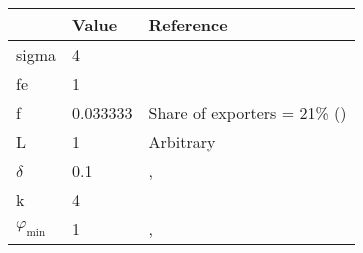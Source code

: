 \begin{tabular}{lll}
& Value & Reference\\
\hline
sigma & 4 & \cite{Irrazabal_2015}\\
fe & 1 & \cite{ghironi}\\
f & 0.033333 & Share of exporters = 21\% (\cite{ghironi}) \\
L & 1 & Arbitrary\\
$\delta$ & 0.1 & \cite{ghironi}, \cite{Irrazabal_2015}\\
k & 4 \\
$\varphi_{\text{min}}$ & 1 & \cite{ghironi}, \cite{Irrazabal_2015}\\
\hline
\end{tabular} 